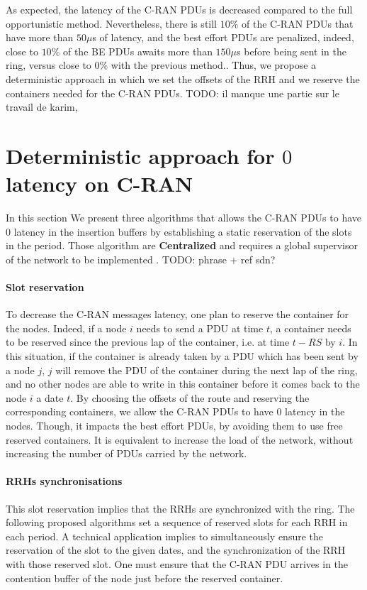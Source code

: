 \documentclass[]{algotel}
\newcommand{\todo}[1]{{\color{red} TODO: {#1}}}
\begin{document}
  As expected, the latency of the C-RAN PDUs is decreased compared to the full opportunistic method. Nevertheless, there is still $10\%$ of the C-RAN PDUs that have more than $50 \mu$s of latency, and the best effort PDUs are penalized, indeed, close to $10\%$ of the BE PDUs awaits more than $150\mu$s before being sent in the ring, versus close to $0\%$ with the previous method..
  Thus, we propose a deterministic approach in which we set the offsets of the RRH and we reserve the containers needed for the C-RAN PDUs.
   \todo{il manque une partie sur le travail de karim, }
  \section{Deterministic approach for $0$ latency on C-RAN}
\label{sec:deterministicalgorithms}

 In this section We present three algorithms that allows the C-RAN PDUs to have $0$ latency in the insertion buffers by establishing a static reservation of the slots in the period.
 Those algorithm are {\bf Centralized} and requires a global supervisor of the network to be implemented .\todo{phrase + ref sdn?}
 
\paragraph{Slot reservation} To decrease the C-RAN messages latency, one plan to reserve the container for the nodes. Indeed, if a node $i$ needs to send a PDU at time $t$, a container needs to be reserved since the previous lap of the container, i.e. at time $t - RS$ by $i$. In this situation, if the container is already taken by a PDU which has been sent by a node $j$, $j$ will remove the PDU of the container during the next lap of the ring, and no other nodes are able to write in this container before it comes back to the node $i$ a date $t$. By choosing the offsets of the route and reserving the corresponding containers, we allow the C-RAN PDUs to have $0$ latency in the nodes. Though, it impacts the best effort PDUs, by avoiding them to use free reserved containers. It is equivalent to increase the load of the network, without increasing the number of PDUs carried by the network. 

\paragraph{RRHs synchronisations}
This slot reservation implies that the RRHs are synchronized with the ring. The following proposed algorithms set a sequence of reserved slots for each RRH in each period. A technical application implies to simultaneously ensure the reservation of the slot to the given dates, and the synchronization of the RRH with those reserved slot. One must ensure that the C-RAN PDU arrives in the contention buffer of the node just before the reserved container.
\end{document}
